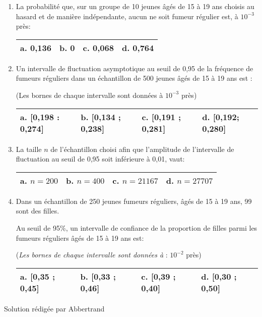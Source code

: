 \begin{enumerate}
     \item
     La probabilité que, sur un groupe de 10 jeunes âgés de 15 à 19 ans choisis au hasard et de manière indépendante, aucun ne soit fumeur régulier est, à $10^{-3}$ près:
     \begin{tabularx}{0.8\linewidth}{|*{3}{>{\centering \arraybackslash }X|}}%
          \hline
          \textbf{a}.   0,136 & \textbf{b}.   0 & \textbf{c}.   0,068 & \textbf{d}.   0,764
          \\ \hline
     \end{tabularx}
     \item
     Un intervalle de fluctuation asymptotique au seuil de 0,95 de la fréquence de fumeurs réguliers dans un échantillon de 500 jeunes âgés de 15 à 19 ans est :
     \par
     (Les bornes de chaque intervalle sont données à $10^{-3}$ près)
     \begin{tabularx}{0.8\linewidth}{|*{3}{>{\centering \arraybackslash }X|}}%
          \hline
          \textbf{a}.    [0,198 : 0,274]  & \textbf{b}.  [0,134 ; 0,238] & \textbf{c}.   [0,191 ; 0,281] & \textbf{d}.   [0,192; 0,280]
          \\ \hline
     \end{tabularx}
     \item
     La taille $n$ de l'échantillon choisi afin que l'amplitude de l'intervalle de fluctuation au seuil de 0,95 soit inférieure à 0,01, vaut:
     \begin{tabularx}{0.8\linewidth}{|*{3}{>{\centering \arraybackslash }X|}}%
          \hline
          \textbf{a}.  $n=200$ & \textbf{b}.  $n=400$ & \textbf{c}.   $n=21167$ & \textbf{d}.   $n=27707$
          \\ \hline
     \end{tabularx}
     \item
     Dans un échantillon de 250 jeunes fumeurs réguliers, âgés de 15 à 19 ans, 99 sont des filles.
     \par
     Au seuil de 95\%, un intervalle de confiance de la proportion de filles parmi les fumeurs réguliers âgés de 15 à 19 ans est:
     \par
     (\textit{Les bornes de chaque intervalle sont données à }: $10^{- 2}$ près)
     \begin{tabularx}{0.8\linewidth}{|*{3}{>{\centering \arraybackslash }X|}}%
          \hline
          \textbf{a}.  [0,35 ; 0,45] & \textbf{b}.   [0,33 ; 0,46] &  \textbf{c}.   [0,39 ; 0,40] &  \textbf{d}.   [0,30 ; 0,50]
          \\ \hline
\end{tabularx}\end{enumerate}
\begin{corrige}
     Solution rédigée par Abbertrand
     \par
     [pdf-embedder url="/wp-content/uploads/slides/qcm-bac-es-liban-2014/qcm-bac-es-liban-2014.pdf" width="676"]
\end{corrige}
